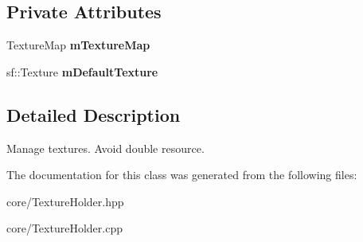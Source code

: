 \subsection*{\-Private \-Attributes}
\begin{DoxyCompactItemize}
\item 
\hypertarget{classTextureHolder_a8f7a9a3896c84ab877f0c5272daf708a_a8f7a9a3896c84ab877f0c5272daf708a}{\-Texture\-Map {\bfseries m\-Texture\-Map}}\label{classTextureHolder_a8f7a9a3896c84ab877f0c5272daf708a_a8f7a9a3896c84ab877f0c5272daf708a}

\item 
\hypertarget{classTextureHolder_a31d4a58279fde9b88a6b2db1dca80b2d_a31d4a58279fde9b88a6b2db1dca80b2d}{sf\-::\-Texture {\bfseries m\-Default\-Texture}}\label{classTextureHolder_a31d4a58279fde9b88a6b2db1dca80b2d_a31d4a58279fde9b88a6b2db1dca80b2d}

\end{DoxyCompactItemize}


\subsection{\-Detailed \-Description}
\-Manage textures. \-Avoid double resource. 

\-The documentation for this class was generated from the following files\-:\begin{DoxyCompactItemize}
\item 
core/\-Texture\-Holder.\-hpp\item 
core/\-Texture\-Holder.\-cpp\end{DoxyCompactItemize}
